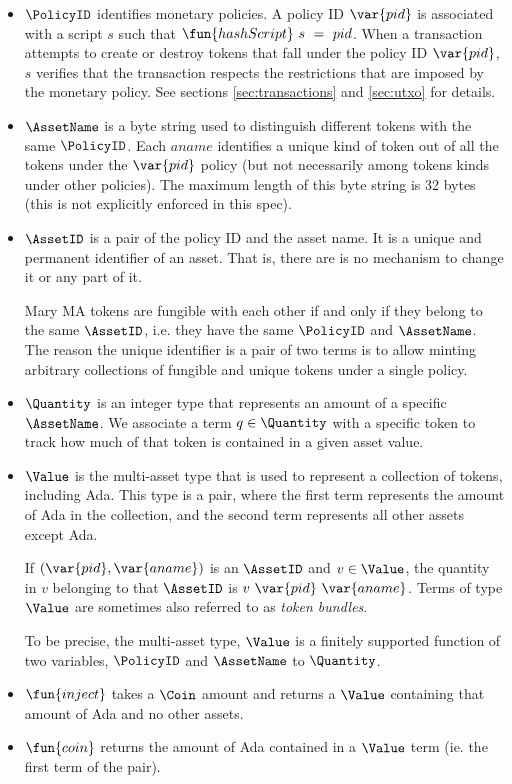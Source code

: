 \begin{itemize}
  \item $\PolicyID$ identifies monetary policies. A policy ID $\var{pid}$ is associated with a script
    $s$ such that $\fun{hashScript}~s~=~pid$. When a transaction attempts to create or destroy tokens
    that fall under the policy ID $\var{pid}$,
    $s$ verifies that the transaction
    respects the restrictions that are imposed by the monetary policy.
    See sections \ref{sec:transactions} and \ref{sec:utxo} for details.

  \item $\AssetName$ is a byte string used to distinguish different tokens with the same $\PolicyID$.
    Each $aname$ identifies a unique kind of token out of all the tokens under the
    $\var{pid}$ policy (but not necessarily among tokens kinds under other policies).
    The maximum length of this
    byte string is 32 bytes (this is not explicitly enforced in this spec).

  \item $\AssetID$ is a pair of the policy ID and the asset name. It is a unique and permanent
  identifier of an asset. That is, there are is no mechanism to change it or
  any part of it.

  Mary MA tokens are fungible with each other if and only if they belong to the same $\AssetID$,
  i.e. they have the same $\PolicyID$ and $\AssetName$.
  The reason the unique identifier is a pair of two terms is to allow
  minting arbitrary collections of fungible and unique tokens under a single policy.

  \item $\Quantity$ is an integer type that represents an amount of a specific $\AssetName$. We associate
    a term $q\in\Quantity$ with a specific token to track how much of that token is contained in a given asset value.

  \item $\Value$ is the multi-asset type that is used to represent
    a collection of tokens, including Ada. This type is a pair, where the first
    term represents the amount of Ada in the collection, and the second term
    represents all other assets except Ada.

    If $(\var{pid}, \var{aname})$ is an $\AssetID$ and $v \in \Value$,
    the quantity in $v$ belonging to that $\AssetID$ is $v~\var{pid}~\var{aname}$.
    Terms of type $\Value$ are sometimes also referred to as
    \emph{token bundles}.

   To be precise, the multi-asset
   type, $\Value$ is a finitely supported function of two variables,
   $\PolicyID$ and $\AssetName$ to $\Quantity$.

  \item $\fun{inject}$ takes a $\Coin$ amount and returns a $\Value$ containing
  that amount of Ada and no other assets.

  \item $\fun{coin}$ returns the amount of Ada contained in a $\Value$ term (ie.
  the first term of the pair).
\end{itemize}

